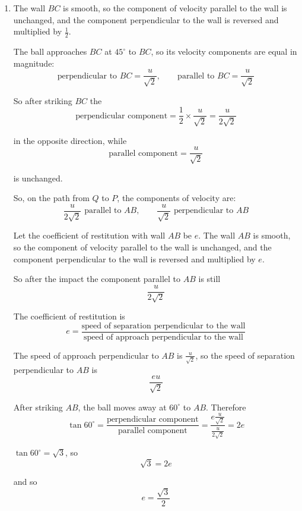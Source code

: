 \documentclass[leqno]{article}
\begin{document}
\begin{enumerate}[
  label=\textbf{\arabic*.},
  leftmargin=*,
  topsep=0pt,
  partopsep=0pt,
  parsep=0pt
]
\vspace*{10pt}

\begin{djsSolution}
\begin{enumerate}[label=\textbf{(\alph*)}]
  \item The wall \(BC\) is smooth, so the component of velocity parallel to the wall is unchanged, and the component perpendicular to the wall is reversed and multiplied by \(\frac12\).

  The ball approaches \(BC\) at \(45^\circ\) to \(BC\), so its velocity components are equal in magnitude:
  \[
  \text{perpendicular to }BC=\frac{u}{\sqrt{2}}, \qquad \text{parallel to }BC=\frac{u}{\sqrt{2}}
  \]

  So after striking \(BC\) the
  \[
  \text{perpendicular component}=\frac12\times \frac{u}{\sqrt2}=\frac{u}{2\sqrt2}
  \]

  in the opposite direction, while
  \[
  \text{parallel component}=\frac{u}{\sqrt2}
  \]

  is unchanged.

  So, on the path from \(Q\) to \(P\), the components of velocity are:
  \[
  \frac{u}{2\sqrt2} \text{ parallel to }AB,
  \qquad
  \frac{u}{\sqrt2} \text{ perpendicular to }AB
  \]

  Let the coefficient of restitution with wall \(AB\) be \(e\). The wall \(AB\) is smooth, so the component of velocity parallel to the wall is unchanged, and the component perpendicular to the wall is reversed and multiplied by \(e\).

  So after the impact the component parallel to \(AB\) is still
  \[
  \frac{u}{2\sqrt2}
  \]

  The coefficient of restitution is
  \[
  e=\dfrac{\text{speed of separation perpendicular to the wall}}{\text{speed of approach perpendicular to the wall}}
  \]

  The speed of approach perpendicular to \(AB\) is \(\frac{u}{\sqrt2}\), so the speed of separation perpendicular to \(AB\) is
  \[
  \frac{eu}{\sqrt2}
  \]

  After striking \(AB\), the ball moves away at \(60^\circ\) to \(AB\). Therefore
  \[
  \tan 60^\circ
  =
  \frac{\text{perpendicular component}}{\text{parallel component}}
  =
  \frac{e\frac{u}{\sqrt2}}{\frac{u}{2\sqrt2}}
  =
  2e
  \]

  \(\tan 60^\circ=\sqrt3\), so
  \[
  \sqrt3=2e
  \]

  and so
  \[
  e=\frac{\sqrt3}{2}
  \]



\end{enumerate}
\end{djsSolution}
\end{enumerate}
\end{document}
